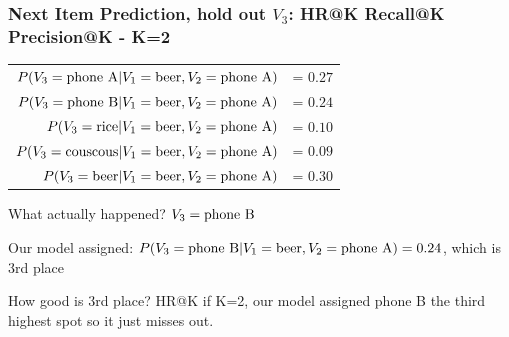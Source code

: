 \begin{frame}
  \frametitle{Next Item Prediction, hold out $V_3$: HR@K Recall@K
    Precision@K - K=2}

  \begin{tabular}{r r}
    $P(V_3 = {\rm phone ~ A} | V_1 = {\rm beer}, V_2 = {\rm phone ~ A} )$ &= $0.27$ \\
    $P(V_3 = {\rm phone ~ B} | V_1 = {\rm beer}, V_2 = {\rm phone ~ A} )$ &= $0.24$ \\
    $P(V_3 = {\rm rice} | V_1 = {\rm beer}, V_2 = {\rm phone ~ A} )$ &= $0.10$ \\
    $P(V_3 = {\rm couscous} | V_1 = {\rm beer}, V_2 = {\rm phone ~ A} )$ &= $0.09$ \\
    $P(V_3 = {\rm beer} | V_1 = {\rm beer}, V_2 = {\rm phone ~ A} )$ &= $0.30$ \\
  \end{tabular}

  What actually happened? \pause $V_3 = {\rm phone ~ B} $


  \vspace{4mm}  
  \pause
Our model assigned: $P(V_3 = {\rm phone ~ B} | V_1 = {\rm beer}, V_2 = {\rm phone ~ A}) = 0.24$, which is 3rd place

How good is 3rd place?
\pause
HR@K if K=2, our model assigned phone B the third highest spot so it just misses out.

\vspace{4mm}  


 \end{frame}


